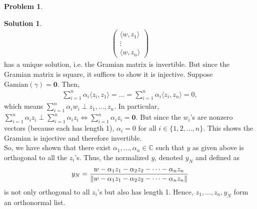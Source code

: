 \documentclass{article}
\theoremstyle{definition}
\newtheorem*{prob*}{Problem}
\newtheorem*{sln*}{Solution}
\newcommand{\la}{\langle}
\newcommand{\ra}{\rangle}
\begin{document}
\begin{prob*}
\begin{enumerate}
\begin{sln*}
\begin{align*}
\begin{pmatrix}
			 \la w,z_1 \ra\\
			 \vdots\\
			 \la w,z_n \ra
			 \end{pmatrix}
			 \end{align*}
			 has a unique solution, i.e. the Gramian matrix is invertible. But since the Gramian matrix is square, it suffices to show it is injective. Suppose $\text{Gamian}(\gamma) = \mathbf{0}$. Then,
			 \begin{align*}
			 \sum^n_{i=1}\alpha_i \la z_i,z_1 \ra = \dots = \sum^n_{i=1}\alpha_i \la z_i,z_n \ra = 0,
			 \end{align*}
			 which means $\sum^n_{i=1}\alpha_i w_i \perp z_1,\dots, z_n$. In particular, $\sum^n_{i=1}\alpha_i z_i \perp \sum^n_{i=1}\alpha_i z_i \iff \sum^n_{i=1}\alpha_i z_i = \mathbf{0}$. But since the $w_i$'s are nonzero vectors (because each has length 1), $\alpha_i = 0$ for all $i \in  \{1,2,\dots,n \}$. This shows the Gramian is injective and therefore invertible. \\
			 
			 So, we have shown that there exist $\alpha_1,\dots,\alpha_n \in \mathbb{C}$ such that $y$ as given above is orthogonal to all the $z_i$'s. Thus, the normalized $y$, denoted $y_N$ and defined as
			 \begin{align*}
			 y_N = \frac{w - \alpha_1 z_1 - \alpha_2 z_2 - \dots - \alpha_n z_n}{\norm{w - \alpha_1 z_1 - \alpha_2 z_2 - \dots - \alpha_n z_n}}
			 \end{align*}
			 is not only orthogonal to all $z_i$'s but also has length 1. Hence, $z_1,\dots,z_n,y_N$ form an orthonormal list. \\
			 

\end{sln*}
\end{enumerate}
\end{prob*}
\end{document}
